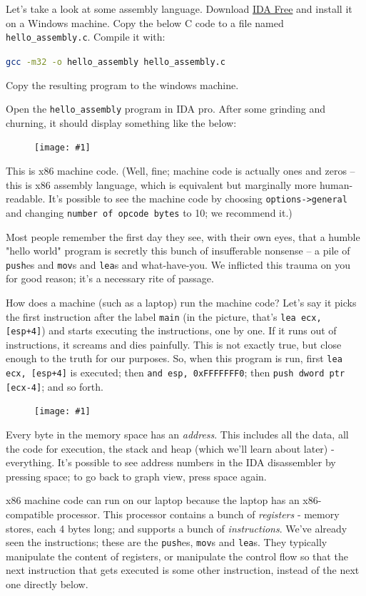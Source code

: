 \documentclass{article}
\newcommand{\displayimage}[1] {
\begin{figure}[H]
    \centering
    \texttt{[image: \#1]} 
\end{figure}
}
\newcommand{\wrapimageleft}[1] {
    \begin{figure}
        \begin{center}
            \texttt{[image: \#1]} 
        \end{center}
    \end{figure}
}
\newcommand{\xcode}[2]{\colorbox{ubuntuback}{\lstinline[language=#1]|#2|}}
\newcommand{\asm}[1]{\xcode{{[x86masm]assembler}}{#1}}
\newcommand{\code}[1]{\colorbox{ubuntuback}{\texttt{#1}}}
\begin{document}
Let's take a look at some assembly language. Download \href{https://hex-rays.com/ida-free}{IDA Free} and install it on a Windows machine. Copy the below C code to a file named \code{hello\_assembly.c}. Compile it with:

\xcode{bash}{gcc -m32 -o hello_assembly hello_assembly.c} 

Copy the resulting program to the windows machine.



Open the \code{hello\_assembly} program in IDA pro. After some grinding and churning, it should display something like the below:

\displayimage{./images/hello_assembly_x86.png}

This is x86 machine code. (Well, fine; machine code is actually ones and zeros -- this is x86 assembly language, which is equivalent but marginally more human-readable. It's possible to see the machine code by choosing \code{options->general} and changing \code{number of opcode bytes} to 10; we recommend it.)

Most people remember the first day they see, with their own eyes, that a humble "hello world" program is secretly this bunch of insufferable nonsense -- a pile of \asm{push}es and \asm{mov}s and \asm{lea}s and what-have-you. We inflicted this trauma on you for good reason; it's a necessary rite of passage.

How does a machine (such as a laptop) run the machine code? Let's say it picks the first instruction after the label \asm{main} (in the picture, that's \asm{lea ecx, [esp+4]}) and starts executing the instructions, one by one. If it runs out of instructions, it screams and dies painfully. This is not exactly true, but close enough to the truth for our purposes. So, when this program is run, first \asm{lea ecx, [esp+4]} is executed; then \asm{and esp, 0xFFFFFFF0}; then \asm{push dword ptr [ecx-4]}; and so forth.

\wrapimageleft{./images/process_memory.jpg}
Every byte in the memory space has an \textit{address}. This includes all the data, all the code for execution, the stack and heap (which we'll learn about later) - everything. It's possible to see address numbers in the IDA disassembler by pressing space; to go back to graph view, press space again.

x86 machine code can run on our laptop because the laptop has an x86-compatible processor. This processor contains a bunch of \textit{registers} - memory stores, each 4 bytes long; and supports a bunch of \textit{instructions}. We've already seen the instructions; these are the \asm{push}es, \asm{mov}s and \asm{lea}s. They typically manipulate the content of registers, or manipulate the control flow so that the next instruction that gets executed is some other instruction, instead of the next one directly below.
\end{document}
